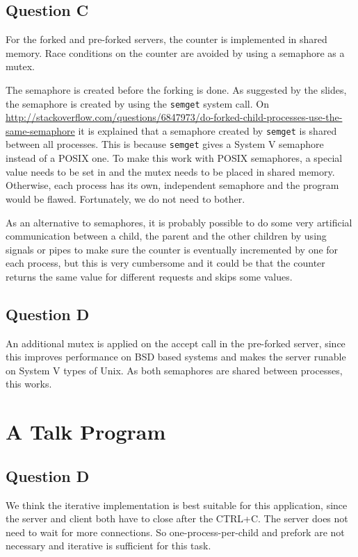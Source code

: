 \documentclass[11pt]{article}
\begin{document}
\subsection{Question C}

For the forked and pre-forked servers, the counter is implemented in shared memory. Race conditions on the counter are avoided by using a semaphore as a mutex.

The semaphore is created before the forking is done. As suggested by the slides, the semaphore is created by using the \texttt{semget} system call. On \url{http://stackoverflow.com/questions/6847973/do-forked-child-processes-use-the-same-semaphore} it is explained that a semaphore created by \texttt{semget} is shared between all processes. This is because \texttt{semget} gives a System V semaphore instead of a POSIX one. To make this work with POSIX semaphores, a special value needs to be set in and the mutex needs to be placed in shared memory. Otherwise, each process has its own, independent semaphore and the program would be flawed. Fortunately, we do not need to bother.

As an alternative to semaphores, it is probably possible to do some very artificial communication between a child, the parent and the other children by using signals or pipes to make sure the counter is eventually incremented by one for each process, but this is very cumbersome and it could be that the counter returns the same value for different requests and skips some values.

\subsection{Question D}

An additional mutex is applied on the accept call in the pre-forked server, since this improves performance on BSD based systems and makes the server runable on System V types of Unix. As both semaphores are shared between processes, this works.

\section{A Talk Program}
\subsection{Question D}
We think the iterative implementation is best suitable for this application, since the server and client both have to close after the CTRL+C. The server does not need to wait for more connections. So one-process-per-child and prefork are not necessary and iterative is sufficient for this task.
\end{document}
